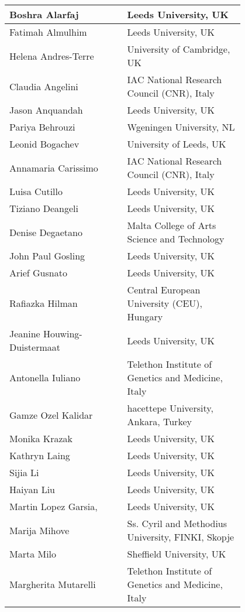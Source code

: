\begin{center}
\begin{longtable}{p{0.4\linewidth} p{0.4\linewidth} }
\hline


Boshra	Alarfaj &	Leeds University, UK  \\ \hline
Fatimah	Almulhim	& Leeds University, UK  \\ \hline
Helena	Andres-Terre	& University of Cambridge, UK  \\ \hline
Claudia	Angelini &	IAC National Research Council (CNR), Italy  \\ \hline
Jason	Anquandah &	Leeds University, UK  \\ \hline
Pariya	Behrouzi	& Wgeningen University, NL  \\ \hline
Leonid	Bogachev	& University of Leeds, UK \\ \hline
Annamaria	Carissimo	& IAC National Research Council (CNR), Italy  \\ \hline
Luisa	Cutillo &	Leeds University, UK  \\ \hline
Tiziano	Deangeli	& Leeds University, UK  \\ \hline
Denise	Degaetano &	Malta College of Arts Science and Technology  \\ \hline
John Paul	Gosling	& Leeds University, UK  \\ \hline
Arief	Gusnato	& Leeds University, UK  \\ \hline
 Rafiazka	Hilman	& Central European University (CEU), Hungary  \\ \hline
Jeanine	Houwing-Duistermaat	& Leeds University, UK  \\ \hline
Antonella	Iuliano &	Telethon Institute of Genetics and Medicine, Italy  \\ \hline
Gamze Ozel	Kalidar	& hacettepe University, Ankara, Turkey  \\ \hline
Monika	Krazak	& Leeds University, UK  \\ \hline
Kathryn	Laing &	Leeds University, UK  \\ \hline
Sijia	Li &	Leeds University, UK  \\ \hline
Haiyan Liu & Leeds University, UK  \\ \hline
Martin Lopez Garsia, & Leeds University, UK  \\ \hline
Marija	Mihove	& Ss. Cyril and Methodius University, FINKI, Skopje  \\ \hline
Marta	Milo	& Sheffield University, UK  \\ \hline
Margherita	Mutarelli	& Telethon Institute of Genetics and Medicine, Italy  \\ \hline

\end{longtable}
\end{center}
